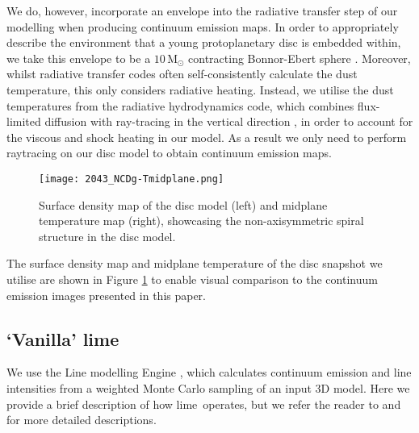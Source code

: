 \documentclass[fleqn,usenatbib]{mnras}
\newcommand{\lime}{{\sc lime}}
\begin{document}
\smallskip

We do, however, incorporate an envelope into the radiative transfer step of our modelling when producing continuum emission maps. In order to appropriately describe the environment that a young protoplanetary disc is embedded within, we take this envelope to be a $10\,\mathrm{M}_{\odot}$ contracting Bonnor-Ebert sphere \citep[see][]{Keto&Caselli2014}. Moreover, whilst radiative transfer codes often self-consistently calculate the dust temperature, this only considers radiative heating. Instead, we utilise the dust temperatures from the radiative hydrodynamics code, which combines flux-limited diffusion with ray-tracing in the vertical direction \citep[see][]{Boley&Durisen2007}, in order to account for the viscous and shock heating in our model. As a result we only need to perform raytracing on our disc model to obtain continuum emission maps.

\begin{figure}
    \texttt{[image: 2043\_NCDg-Tmidplane.png]}
    \caption{Surface density map of the disc model (left) and midplane temperature map (right), showcasing the non-axisymmetric spiral structure in the disc model.}
    \label{fig:ncd-temp}
\end{figure}

The surface density map and midplane temperature of the disc snapshot we utilise are shown in Figure \ref{fig:ncd-temp} to enable visual comparison to the continuum emission images presented in this paper. 

\subsection{`Vanilla' \lime}

We use the Line modelling Engine \citep[\textsc{lime};][]{Brinch&Hogerheijde2010}, which calculates continuum emission and line intensities from a weighted Monte Carlo sampling of an input 3D model. Here we provide a brief description of how \lime\ operates, but we refer the reader to \citet{Brinch&Hogerheijde2010} and \citet[][Section 2.3]{Douglas&Caselli2013} for more detailed descriptions.

\smallskip
\end{document}
